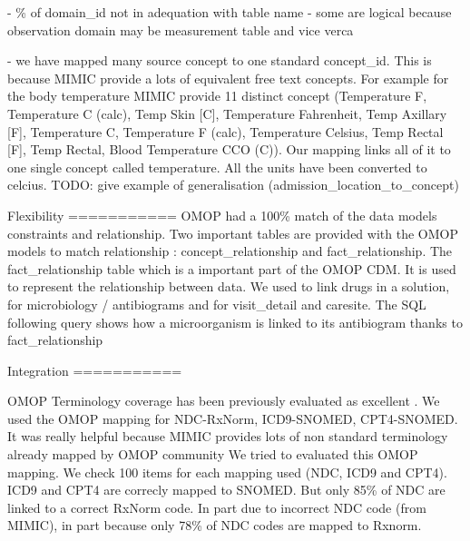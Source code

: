 - \% of domain\_id not in adequation with table name 
	- some are logical because observation domain may be measurement table and vice verca

- we have mapped  many source concept to one standard concept\_id. This is because MIMIC provide a lots of equivalent free text concepts.
  For example for the body temperature MIMIC provide 11 distinct concept (Temperature F, Temperature C (calc), Temp Skin [C], Temperature Fahrenheit, Temp Axillary [F], Temperature C, Temperature F (calc), Temperature Celsius, Temp Rectal [F], Temp Rectal, Blood Temperature CCO (C)). Our mapping links all of it to one single concept called temperature. All the units have been converted to celcius.
  TODO: give example of generalisation (admission\_location\_to\_concept)

Flexibility  
===========
OMOP had a 100\% match of the data models constraints and relationship.
Two important tables are provided with the OMOP models to  match relationship : concept\_relationship and fact\_relationship.
The fact\_relationship table which is a important part of the OMOP CDM. It is used to represent the relationship between data.
We used to link drugs in a solution, for microbiology / antibiograms and for visit\_detail and caresite.
The SQL following query shows how a microorganism is linked to its antibiogram thanks to fact\_relationship

%


Integration
===========

OMOP Terminology coverage has been previously evaluated as excellent
\cite{omop-vs-pcornet}. We used the OMOP mapping for NDC-RxNorm, ICD9-SNOMED,
CPT4-SNOMED. It was really helpful because MIMIC provides lots of non standard
terminology already mapped by OMOP community
We tried to evaluated this OMOP mapping.
We check 100 items for each mapping used (NDC, ICD9 and CPT4). ICD9 and CPT4 are correcly mapped to SNOMED. But only 85\% of NDC are
linked to a correct RxNorm code. In part due to incorrect NDC code (from MIMIC), in part because only 78\% of NDC codes are mapped to Rxnorm.

